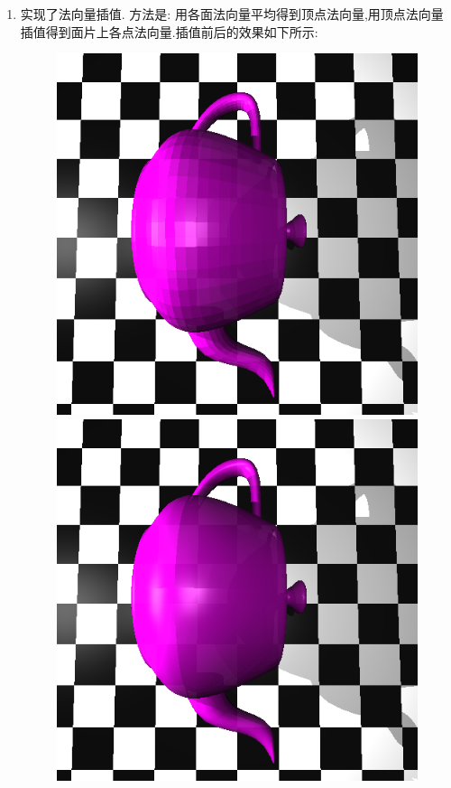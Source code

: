 \begin{enumerate}
\item 实现了法向量插值. 方法是: 用各面法向量平均得到顶点法向量,用顶点法向量插值得到面片上各点法向量.插值前后的效果如下所示:
\begin{figure}[H]
\begin{minipage}[b]{0.46\linewidth}
  \centering
  \includegraphics[width=\textwidth]{img/rough.png}
\end{minipage}
\begin{minipage}[b]{0.46\linewidth}
  \centering
  \includegraphics[width=\textwidth]{img/smooth.png}
\end{minipage}
\end{figure}


\end{enumerate}
